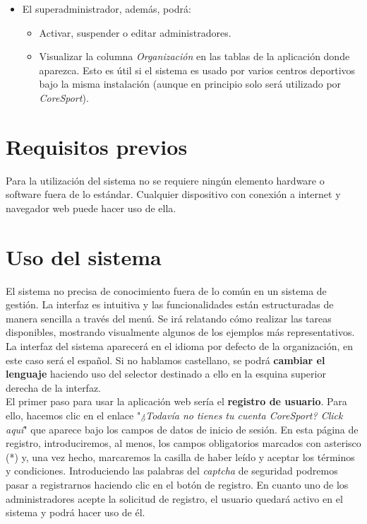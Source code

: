 \begin{itemize}
\item El superadministrador, además, podrá:

\begin{itemize}
\item Activar, suspender o editar administradores.
\item Visualizar la columna \textit{Organización} en las tablas de la aplicación donde aparezca. Esto es útil si el sistema es usado por varios centros deportivos bajo la misma instalación (aunque en principio solo será utilizado por \textit{CoreSport}).
\end{itemize}

\end{itemize}


\section{Requisitos previos}

Para la utilización del sistema no se requiere ningún elemento hardware o software fuera de lo estándar. Cualquier dispositivo con conexión a internet y navegador web puede hacer uso de ella. 


\section{Uso del sistema}

El sistema no precisa de conocimiento fuera de lo común en un sistema de gestión. La interfaz es intuitiva y las funcionalidades están estructuradas de manera sencilla a través del menú. Se irá relatando cómo realizar las tareas disponibles, mostrando visualmente algunos de los ejemplos más representativos. \\

La interfaz del sistema aparecerá en el idioma por defecto de la organización, en este caso será el español. Si no hablamos castellano, se podrá \textbf{cambiar el lenguaje} haciendo uso del selector destinado a ello en la esquina superior derecha de la interfaz. \\

El primer paso para usar la aplicación web sería el \textbf{registro de usuario}. Para ello, hacemos clic en el enlace "\textit{¿Todavía no tienes tu cuenta CoreSport? Click aquí}" que aparece bajo los campos de datos de inicio de sesión. En esta página de registro, introduciremos, al menos, los campos obligatorios marcados con asterisco (*) y, una vez hecho, marcaremos la casilla de haber leído y aceptar los términos y condiciones. Introduciendo las palabras del \textit{captcha} de seguridad podremos pasar a registrarnos haciendo clic en el botón de registro. En cuanto uno de los administradores acepte la solicitud de registro, el usuario quedará activo en el sistema y podrá hacer uso de él. \\

